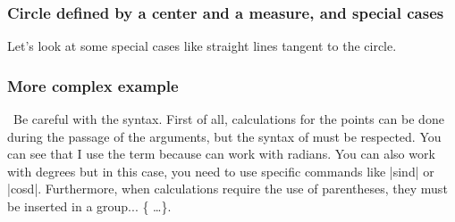 \subsubsection{Circle defined by a center and a measure, and special cases}
Let's look at some special cases like straight lines tangent to the circle.

\begin{tkzexample}[latex=7cm,small]
\end{tkzexample}

\subsubsection{More complex example}
\tkzHandBomb\ Be careful with the syntax. First of all, calculations for the points can be done during the passage of the arguments, but the syntax of  must be respected. You can see that I use the term  because  can work with radians. You can also work with degrees but in this case, you need to use  specific commands like |sind| or |cosd|. Furthermore, when calculations require the use of parentheses, they must be inserted in a group... \TEX \{ \dots \}.

\begin{tkzexample}[latex=7cm,small]
\end{tkzexample}

